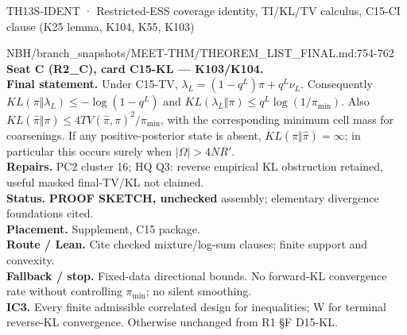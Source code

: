 \begin{card}{TH13}{S-IDENT · Restricted-ESS coverage identity, TI/KL/TV calculus, C15-CI clause (K25 lemma, K104, K55, K103)}
\begin{stmt}{NBH/branch_snapshots/MEET-THM/THEOREM_LIST_FINAL.md:754-762}
\textbf{Seat C (R2\_C), card C15-KL — K103/K104.}\\
\textbf{Final statement.} Under C15-TV, $\lambda_L=(1-q^L)\pi+q^L\nu_L$. Consequently $KL(\pi\Vert\lambda_L)\le-\log(1-q^L)$ and $KL(\lambda_L\Vert\pi)\le q^L\log(1/\pi_{\min})$. Also $KL(\widehat\pi\Vert\pi)\le4TV(\widehat\pi,\pi)^2/\pi_{\min}$, with the corresponding minimum cell mass for coarsenings. If any positive-posterior state is absent, $KL(\pi\Vert\widehat\pi)=\infty$; in particular this occurs surely when $\lvert\Omega\rvert>4NR'$.\\
\textbf{Repairs.} PC2 cluster 16; HQ Q3: reverse empirical KL obstruction retained, useful masked final-TV/KL not claimed.\\
\textbf{Status.} \textbf{PROOF SKETCH, unchecked} assembly; elementary divergence foundations cited.\\
\textbf{Placement.} Supplement, C15 package.\\
\textbf{Route / Lean.} Cite checked mixture/log-sum clauses; finite support and convexity.\\
\textbf{Fallback / stop.} Fixed-data directional bounds. No forward-KL convergence rate without controlling $\pi_{\min}$; no silent smoothing.\\
\textbf{IC3.} Every finite admissible correlated design for inequalities; W for terminal reverse-KL convergence. Otherwise unchanged from R1 §F D15-KL.
\end{stmt}


\end{card}
